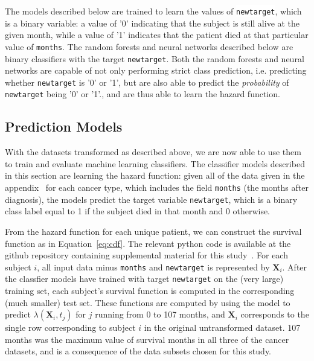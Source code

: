 \documentclass[10pt,letterpaper]{article}
\newcommand{\codewhite}[1]{\colorbox{white}{\texttt{#1}}}
\begin{document}
The models described below are trained to learn the values of \codewhite{newtarget}, which is a binary variable: a value of '0' indicating that the subject is still alive at the given month, while a value of '1' indicates that the patient died at that particular value of \codewhite{months}. The random forests and neural networks described below are binary classifiers with the target \codewhite{newtarget}. 
Both the random forests and neural networks are capable of not only performing strict class prediction, i.e. predicting whether \codewhite{newtarget} is '0' or '1', but are also able to predict the \textit{probability} of \codewhite{newtarget} being '0' or '1'., and are thus able to learn the hazard function.






\subsection*{Prediction Models}
\label{sec:predmodels}

With the datasets transformed as described above, we are now able to use them to train and evaluate machine learning classifiers.
The classifier models described in this section are learning the hazard function: given all of the data given in the appendix~ for each cancer type, which includes the field \codewhite{months} (the months after diagnosis), the models predict the target variable \codewhite{newtarget}, which is a binary class label equal to 1 if the subject died in that month and 0 otherwise.




From the hazard function for each unique patient, we can construct the
survival function as in Equation~\ref{eq:cdf}.
The relevant python code is available at the github repository containing supplemental material for this study~\cite{supp}.
For each subject $i$, all input data minus \codewhite{months} and \codewhite{newtarget} is represented by $\mathbf{X}_{i}$. After the classfier models have trained with target \codewhite{newtarget} on the (very large) training set, each subject's survival function is computed in the corresponding (much smaller) test set.
These functions are computed by using the model to predict $\lambda(\mathbf{X}_i, t_{j})$ for $j$ running from 0 to 107 months, and $\mathbf{X}_{i}$ corresponds to the single row corresponding to subject $i$ in the original untransformed dataset.
107 months was the maximum value of survival months in all three of the cancer datasets, and is a consequence of the data subsets chosen for this study.
\end{document}
